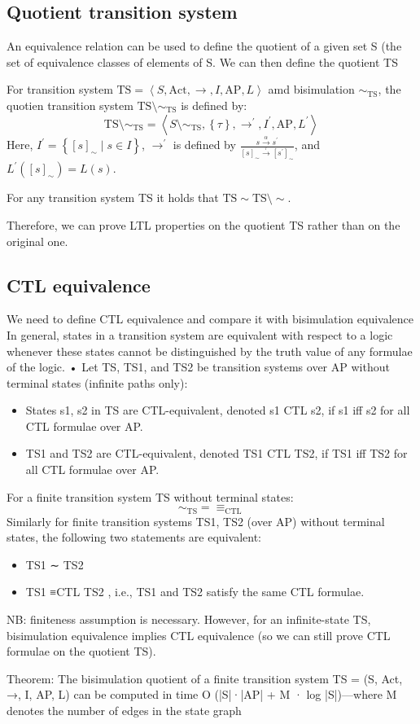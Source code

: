 \subsection{Quotient transition system}
An equivalence relation can be used to define the quotient of a given set S (the set of
equivalence classes of elements of S. We can then define the quotient TS
\begin{definition}
    For transition system $\text{TS}=\left\langle S,\text{Act},\rightarrow,I,\text{AP},L\right\rangle$ amd bisimulation $\sim_{\text{TS}}$, the quotien transition system $\text{TS}\setminus\sim_{\text{TS}}$ is defined by: 
    \[\text{TS}\setminus\sim_{\text{TS}}=\left\langle S\setminus\sim_{\text{TS}},\left\{\tau\right\},\rightarrow^\prime,I^\prime,\text{AP},L^\prime\right\rangle\]
    Here, $I^\prime=\left\{[s]_{\sim}\mid s \in I\right\}$, $\rightarrow^\prime$ is defined by $\frac{s\overset{\alpha}{\rightarrow}s^\prime}{[s]_{\sim}\overset{\tau}{\rightarrow}[s^\prime]_{\sim}}$, and $L^\prime([s]_{\sim})=L(s)$.
\end{definition}
\begin{theorem}
    For any transition system TS it holds that $\text{TS}\sim\text{TS}\setminus\sim$. 
\end{theorem}
\noindent Therefore, we can prove LTL properties on the quotient TS rather than on the original one.

\subsection{CTL equivalence}
We need to define CTL equivalence and compare it with bisimulation
equivalence
In general, states in a transition system are equivalent with respect to a logic
whenever these states cannot be distinguished by the truth value of any formulae of
the logic.
• Let TS, TS1, and TS2 be transition systems over AP without terminal states (infinite
paths only): 
\begin{itemize}
    \item States s1, s2 in TS are CTL-equivalent, denoted s1 \equiv CTL s2, if s1 \models \phi iff s2 \models \phi for all CTL formulae over AP.
    \item TS1 and TS2 are CTL-equivalent, denoted TS1 \equiv CTL TS2, if TS1 \models \phi iff TS2 \models \phi for all CTL formulae over AP.
\end{itemize}
\noindent For a finite transition system TS without terminal states: 
\[\sim_{\text{TS}}=\equiv_{\text{CTL}}\]
Similarly for finite transition systems TS1, TS2 (over AP) without terminal states, the
following two statements are equivalent:
\begin{itemize}
    \item TS1 ∼ TS2
    \item TS1 ≡CTL TS2 , i.e., TS1 and TS2 satisfy the same CTL formulae.
    
\end{itemize}
NB: finiteness assumption is necessary. However, for an infinite-state TS, bisimulation
equivalence implies CTL equivalence (so we can still prove CTL formulae on the quotient TS).

\begin{theorem}
    Theorem: The bisimulation quotient of a finite transition system TS = (S, Act, →, I, AP, L) can be computed in time O (|S|·|AP| + M · log |S|)---where M denotes the number of edges in the state graph
\end{theorem}